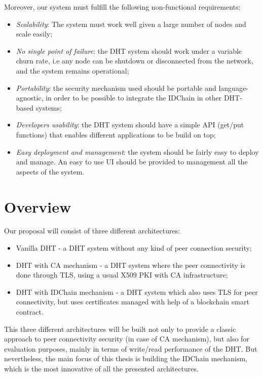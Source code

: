 Moreover, our system must fulfill the following non-functional requirements:

\begin{itemize}
  \item \textit{Scalability}: The system must work well given a large number of nodes and scale easily;
  \item \textit{No single point of failure}: the DHT system should work under a variable churn rate, i.e any node can be shutdown or disconnected from the network, and the system remains operational;
  \item \textit{Portability}: the security mechanism used should be portable and language-agnostic, in order to be possible to integrate the IDChain in other DHT-based systems;
  \item \textit{Developers usability}: the DHT system should have a simple API (get/put functions) that enables different applications to be build on top;
  \item \textit{Easy deployment and management}: the system should be fairly easy to deploy and manage. An easy to use \ac{UI} should be provided to management all the aspects of the system.
\end{itemize}

\section{Overview}\label{architecture:overview}

Our proposal will consist of three different architectures:

\begin{itemize}
  \item Vanilla \ac{DHT} - a \ac{DHT} system without any kind of peer connection security;
  \item DHT with \ac{CA} mechanism - a \ac{DHT} system where the peer connectivity is done through TLS, using a usual X509 \ac{PKI} with \ac{CA} infrastructure;
  \item DHT with IDChain mechanism - a \ac{DHT} system which also uses TLS for peer connectivity, but uses certificates managed with help of a blockchain smart contract.
\end{itemize}

This three different architectures will be built not only to provide a classic approach to peer connectivity security (in case of \ac{CA} mechanism), but also for evaluation purposes, mainly in terms of write/read performance of the \ac{DHT}.
But nevertheless, the main focus of this thesis is building the IDChain mechanism, which is the most innovative of all the presented architectures.

